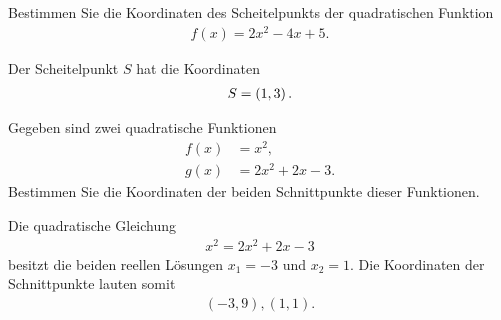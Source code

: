 \begin{questions}

\clearpage
{}
\question[2] Bestimmen Sie die Koordinaten des Scheitelpunkts der quadratischen Funktion 
\begin{align*}
    f(x) = 2x^2 - 4x + 5.
\end{align*}

\begin{solution}
Der Scheitelpunkt $S$ hat die Koordinaten
\begin{align*}
    S = \left(1,3\right).
\end{align*}
\end{solution}

\question[1] Gegeben sind zwei quadratische Funktionen
\begin{align*}
    f(x) &= x^2, \\
    g(x) &= 2x^2+2x-3.
\end{align*}
Bestimmen Sie die Koordinaten der beiden Schnittpunkte dieser Funktionen.
\begin{solution}
Die quadratische Gleichung
\begin{align*}
    x^2 = 2x^2 + 2x - 3
\end{align*}
besitzt die beiden reellen Lösungen $x_1 = -3$ und $x_2 = 1$. Die Koordinaten der Schnittpunkte lauten somit
\begin{align*}
    (-3,9), (1,1).
\end{align*}
\end{solution}


\end{questions}
